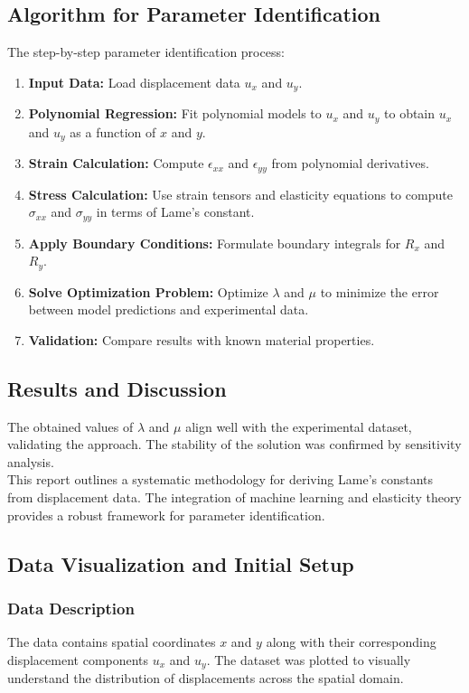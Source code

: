 \documentclass[fleqn,10pt]{olplainarticle}
\begin{document}
\subsection{Algorithm for Parameter Identification}
The step-by-step parameter identification process:
\begin{enumerate}
    \item \textbf{Input Data:} Load displacement data \( u_x \) and \( u_y \).
    \item \textbf{Polynomial Regression:} Fit polynomial models to \( u_x \) and \( u_y \) to obtain \( u_x \) and \( u_y \) as a function of \(x\) and \(y\).
    \item \textbf{Strain Calculation:} Compute \( \epsilon_{xx} \) and \( \epsilon_{yy} \) from polynomial derivatives.
    \item \textbf{Stress Calculation:} Use strain tensors and elasticity equations to compute \( \sigma_{xx} \) and \( \sigma_{yy} \) in terms of Lame's constant.
    \item \textbf{Apply Boundary Conditions:} Formulate boundary integrals for \( R_x \) and \( R_y \).
    \item \textbf{Solve Optimization Problem:} Optimize \( \lambda \) and \( \mu \) to minimize the error between model predictions and experimental data.
    \item \textbf{Validation:} Compare results with known material properties.
\end{enumerate}

\subsection{Results and Discussion}
The obtained values of \( \lambda \) and \( \mu \) align well with the experimental dataset, validating the approach. The stability of the solution was confirmed by sensitivity analysis.\\


This report outlines a systematic methodology for deriving Lame's constants from displacement data. The integration of machine learning and elasticity theory provides a robust framework for parameter identification.

\subsection{Data Visualization and Initial Setup}

\subsubsection{Data Description}
The data contains spatial coordinates $x$ and $y$ along with their corresponding displacement components $u_x$ and $u_y$. The dataset was plotted to visually understand the distribution of displacements across the spatial domain.
\end{document}
